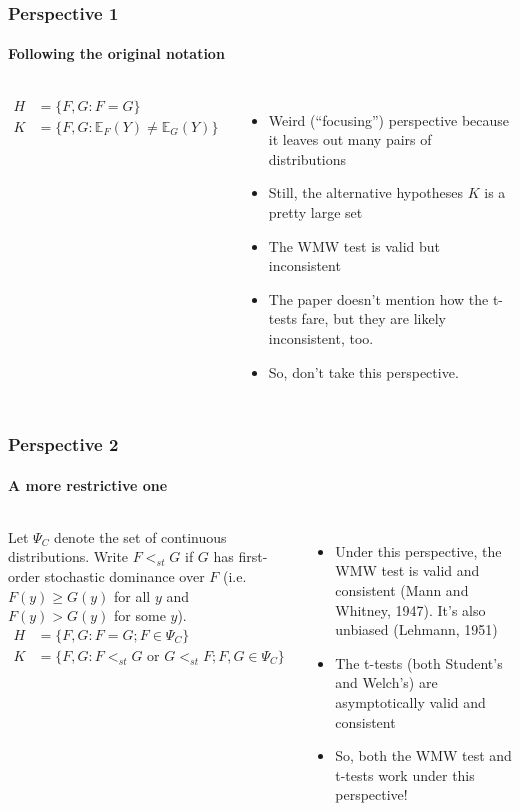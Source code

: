 \renewcommand{\myspacing}{\vspace{1em}}
\begin{frame}\frametitle{Perspective 1}
\framesubtitle{Following the original notation}
	\begin{columns}
\begin{per}
\vspace{-1.5em}
\begin{align*}
    H &= \{F, G: F=G\}\\
    K &= \{F, G: \mathbb{E}_F(Y) \neq \mathbb{E}_G(Y)\}
\end{align*}
\end{per}
\begin{itemize}
\item Weird (``\alert{focusing}'') perspective because it leaves out many pairs of distributions
\item Still, the alternative hypotheses $K$ is a pretty large set
\item The WMW test is \alert{valid but inconsistent}
\item The paper doesn't mention how the t-tests fare, but they are likely inconsistent, too.
\item So, don't take this perspective.
\end{itemize}
\end{columns}
\end{frame}



\renewcommand{\myspacing}{\vspace{1em}}
\begin{frame}\frametitle{Perspective 2}
\framesubtitle{A more restrictive one}
	\begin{columns}
		\begin{per}
			Let $\Psi_C$ denote the set of continuous distributions. Write $F <_{st} G$ if $G$ has \alert{first-order stochastic dominance} over $F$ {\scriptsize (i.e. $F(y)\geq G(y)$ for all $y$ and $F(y)> G(y)$ for some $y$)}.
			\vspace{-1em}
			\begin{align*}
				H &= \{F, G: F=G; F \in \Psi_C\}\\
				K &= \{F, G: F<_{st}G \text{ or } G<_{st}F; F,G \in \Psi_C \}
			\end{align*}
		\end{per}
		\begin{itemize}
			\item Under this perspective, the WMW test is \alert{valid} and \alert{consistent} {\scriptsize (Mann and Whitney, 1947)}. It's also \alert{unbiased} {\scriptsize (Lehmann, 1951)}
			\item The t-tests {\scriptsize (both Student's and Welch's)} are \alert{asymptotically valid} and \alert{consistent}
			\item So, both the WMW test and t-tests work under this perspective!
		\end{itemize}
	\end{columns}
\end{frame}

